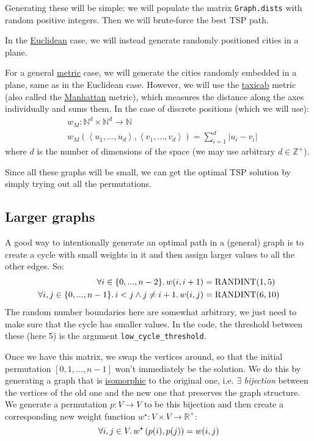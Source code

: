 \documentclass{article}
\newcommand{\randint}{\operatorname{RANDINT}}
\newcommand{\uu}[1]{\underline{#1}}
\newcommand{\ii}[1]{\textit{#1}}
\newcommand{\py}[1]{\lstinline[language=Python]{#1}}
\begin{document}
Generating these will be simple: we will populate the matrix
\py{Graph.dists} with random positive integers. Then we will
brute-force the best TSP path.

In the \uu{Euclidean} case, we will instead generate randomly positioned
cities in a plane.

For a general \uu{metric} case, we will generate the cities randomly embedded
in a plane, same as in the Euclidean case. However, we will use
the \uu{taxicab} metric (also called the \uu{Manhattan} metric), which measures
the distance along the axes individually and sums them. In the case of discrete
positions (which we will use):
\begin{align*}
  & w_M: \mathbb{N}^d \times \mathbb{N}^d \to \mathbb{N} \\
  & w_M\left(\left<u_1,...,u_d\right>, \left<v_1,...,v_d\right>\right) = \sum_{i=1}^d \left|u_i - v_i\right|
\end{align*}
where $d$ is the number of dimensions of the space (we may use arbitrary
$d\in\mathbb{Z}^{+}$).

Since all these graphs will be small, we can get the optimal TSP solution by
simply trying out all the permutations.

\subsection{Larger graphs}

A good way to intentionally generate an optimal path in a (general) graph is to create
a cycle with small weights in it and then assign larger values to all the other
edges. So:
\begin{align*}\forall i\in\{0,...,n-2\}\ldotp w(i,i+1) & =\randint(1,5)\\
  \forall i,j\in\{0,...,n-1\}\ldotp i< j \wedge j\ne i+1 \ldotp
  w(i,j) & = \randint(6,10) \\
\end{align*}
The random number boundaries here are somewhat arbitrary, we just need to make
sure that the cycle has smaller values. In the code, the threshold between these
(here 5) is the argument \py{low_cycle_threshold}.

Once we have this matrix, we swap the vertices around, so that the initial
permutation $[0,1,...,n-1]$ won't immediately be the solution. We do this by
generating a graph that is \uu{isomorphic} to the original one, i.e. $\exists$
\ii{bijection} between the vertices of the old one and the new one that preserves
the graph structure. We
generate a permutation $p:V\to V$ to be this bijection and then create a corresponding
new weight function $w^\star:V\times V \to \mathbb{R}^{+}$:
\[ \forall i,j\in V \ldotp
  w^\star\left( p(i), p(j) \right)
  = w(i,j) \]
\end{document}
